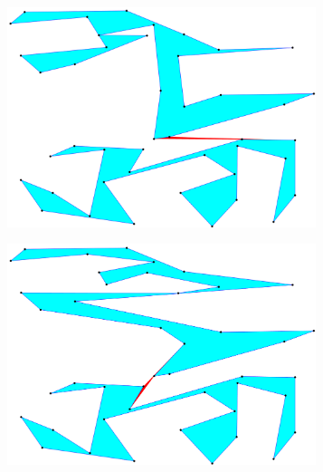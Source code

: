 \documentclass[conference]{IEEEtran}
\begin{document}
\begin{figure}[htbp]
				\begin{subfigure}{0.45\linewidth}
					\centering
					\includegraphics[width=0.99\textwidth]{fig1e.png}
					\caption{}
					\label{fig1e}
				\end{subfigure}
				\begin{subfigure}{0.45\linewidth}
					\centering
					\includegraphics[width=0.99\textwidth]{fig1f.png}
					\caption{}
					\label{fig1f}
				\end{subfigure}
				

\end{figure}
\end{document}
